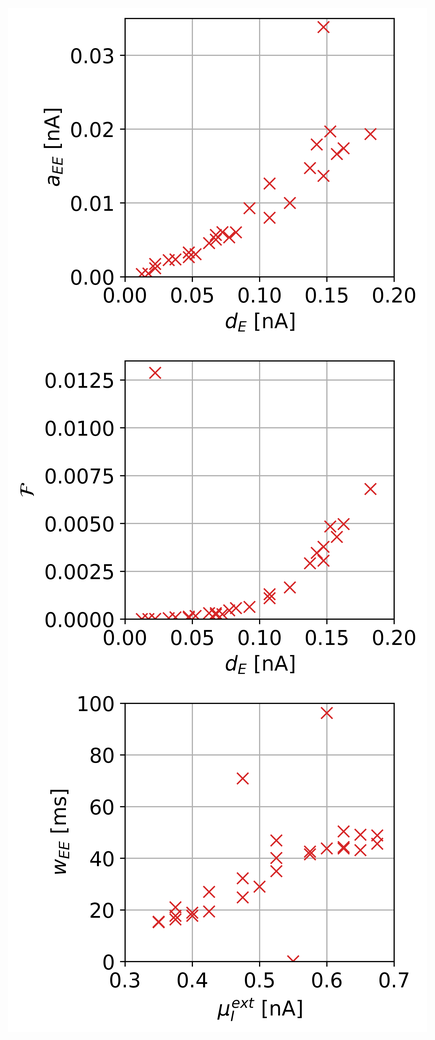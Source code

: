 \documentclass[]{article}
\begin{document}
\begin{minipage}{0.33\textwidth}
	\includegraphics[width=\textwidth]{../rate_2.png}
\end{minipage}
\end{document}
